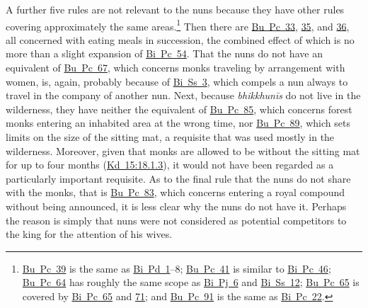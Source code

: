\documentclass[12pt,openany]{book}%
\begin{document}
A further five rules are not relevant to the nuns because they have other rules covering approximately the same areas.\footnote{\href{https://suttacentral.net/pli-tv-bu-vb-pc39/en/brahmali\#2.10.1}{Bu~Pc~39} is the same as \href{https://suttacentral.net/pli-tv-bi-vb-pd1/en/brahmali\#1.2.9.1}{Bi~Pd~1}–8; \href{https://suttacentral.net/pli-tv-bu-vb-pc41/en/brahmali\#1.2.15.1}{Bu~Pc~41} is similar to \href{https://suttacentral.net/pli-tv-bi-vb-pc46/en/brahmali\#1.15.1}{Bi~Pc~46}; \href{https://suttacentral.net/pli-tv-bu-vb-pc64/en/brahmali\#1.23.1}{Bu~Pc~64} has roughly the same scope as \href{https://suttacentral.net/pli-tv-bi-vb-pj6/en/brahmali\#1.23.1}{Bi~Pj~6} and \href{https://suttacentral.net/pli-tv-bi-vb-ss12/en/brahmali\#1.11.1}{Bi~Ss~12}; \href{https://suttacentral.net/pli-tv-bu-vb-pc65/en/brahmali\#1.53.1}{Bu~Pc~65} is covered by \href{https://suttacentral.net/pli-tv-bi-vb-pc65/en/brahmali\#1.17.1}{Bi~Pc~65} and \href{https://suttacentral.net/pli-tv-bi-vb-pc71/en/brahmali\#1.17.1}{71}; and \href{https://suttacentral.net/pli-tv-bu-vb-pc91/en/brahmali\#1.14.1}{Bu~Pc~91} is the same as \href{https://suttacentral.net/pli-tv-bi-vb-pc22/en/brahmali\#1.14.1}{Bi~Pc~22}. } Then there are \href{https://suttacentral.net/pli-tv-bu-vb-pc33/en/brahmali\#3.15.1}{Bu~Pc~33}, \href{https://suttacentral.net/pli-tv-bu-vb-pc35/en/brahmali\#2.15.1}{35}, and \href{https://suttacentral.net/pli-tv-bu-vb-pc36/en/brahmali\#1.28.1}{36}, all concerned with eating meals in succession, the combined effect of which is no more than a slight expansion of \href{https://suttacentral.net/pli-tv-bi-vb-pc54/en/brahmali\#1.20.1}{Bi~Pc~54}. That the nuns do not have an equivalent of \href{https://suttacentral.net/pli-tv-bu-vb-pc67/en/brahmali\#1.28.1}{Bu~Pc~67}, which concerns monks traveling by arrangement with women, is, again, probably because of \href{https://suttacentral.net/pli-tv-bi-vb-ss3/en/brahmali\#4.14.1}{Bi~Ss~3}, which compels a nun always to travel in the company of another nun. Next, because \textit{\textsanskrit{bhikkhunīs}} do not live in the wilderness, they have neither the equivalent of \href{https://suttacentral.net/pli-tv-bu-vb-pc85/en/brahmali\#4.9.1}{Bu~Pc~85}, which concerns forest monks entering an inhabited area at the wrong time, nor \href{https://suttacentral.net/pli-tv-bu-vb-pc89/en/brahmali\#2.10.1}{Bu~Pc~89}, which sets limits on the size of the sitting mat, a requisite that was used mostly in the wilderness. Moreover, given that monks are allowed to be without the sitting mat for up to four months (\href{https://suttacentral.net/pli-tv-kd15/en/brahmali\#18.1.3}{Kd~15:18.1.3}), it would not have been regarded as a particularly important requisite. As to the final rule that the nuns do not share with the monks, that is \href{https://suttacentral.net/pli-tv-bu-vb-pc83/en/brahmali\#1.3.56.1}{Bu~Pc~83}, which concerns entering a royal compound without being announced, it is less clear why the nuns do not have it. Perhaps the reason is simply that nuns were not considered as potential competitors to the king for the attention of his wives.
\end{document}
